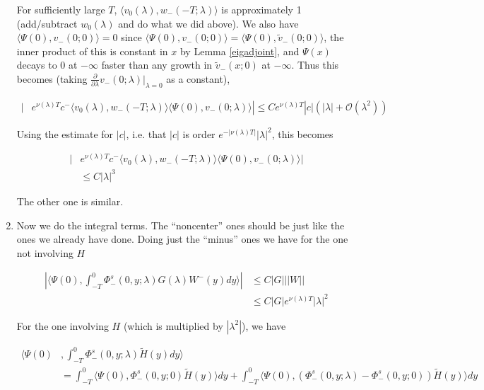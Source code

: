 \documentclass[12pt]{article}
\begin{document}
\begin{enumerate}
For sufficiently large $T$, $\langle v_0(\lambda), w_-(-T; \lambda) \rangle$ is approximately 1 (add/subtract $w_0(\lambda)$ and do what we did above). We also have $\langle \Psi(0), v_-(0; 0) \rangle = 0$ since $\langle \Psi(0), v_-(0; 0) \rangle = \langle \Psi(0), \tilde{v}_-(0; 0) \rangle$, the inner product of this is constant in $x$ by Lemma \ref{eigadjoint}, and $\Psi(x)$ decays to 0 at $-\infty$ faster than any growth in $\tilde{v}_-(x; 0)$ at $-\infty$. Thus this becomes (taking $\frac{\partial}{\partial \lambda}v_-(0; \lambda)\Big|_{\lambda = 0}$ as a constant),

\begin{align*}
|&e^{\nu(\lambda)T} c^- \langle v_0(\lambda), w_-(-T; \lambda) \rangle \langle \Psi(0), v_-(0; \lambda) \rangle|
\leq C e^{\nu(\lambda)T}|c| (|\lambda| + \mathcal{O}(\lambda^2) )
\end{align*}

Using the estimate for $|c|$, i.e. that $|c|$ is order $e^{-|\nu(\lambda)T|} |\lambda|^2$, this becomes 

\begin{align*}
|&e^{\nu(\lambda)T} c^- \langle v_0(\lambda), w_-(-T; \lambda) \rangle \langle \Psi(0), v_-(0; \lambda) \rangle|\\
&\leq C |\lambda|^3
\end{align*}

The other one is similar.

\item Now we do the integral terms. The ``noncenter'' ones should be just like the ones we already have done. Doing just the ``minus'' ones we have for the one not involving $H$

\begin{align*}
\left| \langle \Psi(0), \int_{-T}^0 \Phi^s_-(0, y; \lambda) G(\lambda)W^-(y) dy \rangle \right|
&\leq C |G| ||W|| \\
&\leq C |G| e^{\nu(\lambda)T}|\lambda|^2 
\end{align*}

For the one involving $H$ (which is multiplied by $|\lambda^2|$), we have

\begin{align*}
\langle \Psi(0)&, \int_{-T}^0 \Phi^s_-(0, y; \lambda) \tilde{H}(y) dy \rangle \\ 
&= \int_{-T}^0 \langle \Psi(0), \Phi^s_-(0, y; 0) \tilde{H}(y) \rangle dy + 
\int_{-T}^0 \langle \Psi(0), (\Phi^s_-(0, y; \lambda) - \Phi^s_-(0, y; 0)) \tilde{H}(y) \rangle dy
\end{align*}


\end{enumerate}
\end{document}
